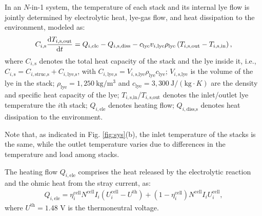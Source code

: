 \documentclass[review,3p,10pt]{elsarticle}
\begin{document}
In an $N$-in-1 system, the temperature of each stack and its internal lye flow is jointly determined by electrolytic heat, lye-gas flow, and heat dissipation to the environment, modeled as:
\begin{align}
  C_{i,\text{s}} \dfrac{{\text{d}}T_{i,\text{s,out}}}{\text{d}t} = Q_{i,\text{ele}} - Q_{i,\text{s,diss}} - c_{\text{lye}} v_{i,\text{lye}} \rho_{\rm{lye}} \left( T_{i,\text{s,out}} - T_{i,\text{s,in}} \right), \label{eq:heatstack}
\end{align}
where $C_{i,\text{s}}$ denotes the total heat capacity of the stack and the lye inside it, i.e., $C_{i,\text{s}} = C_{i,\text{struc,s}} + C_{i,\text{lye,s}}$, with $C_{i,\text{lye,s}} = V_{i,\text{s,lye}} \rho_\text{lye} c_\text{lye}$; $V_{i,\text{s,lye}}$ is the volume of the lye in the stack; $\rho_\text{lye} = 1,250\ \text{kg}/\text{m}^{3}$ and $c_\text{lye} = 3,300\ \text{J}/(\text{kg}\cdot{K})$  are the density and specific heat capacity of the lye; $T_{i,\text{s,in}}$/$T_{i,\text{s,out}}$ denotes the inlet/outlet lye temperature the $i$th stack; %
$Q_{i,\text{ele}}$ denotes heating flow; $Q_{i,\text{diss,s}}$ denotes heat dissipation to the environment. %

Note that, as indicated in Fig. \ref{fig:sys}(b), the inlet temperature of the stacks %
is the same, while the outlet temperature varies due to differences in the temperature and load among stacks.

The heating flow $Q_{i,\text{ele}}$ comprises the heat released by the electrolytic reaction and the ohmic heat from the stray current, as:
\begin{align}
  Q_{i,\text{ele}} = \eta_i^{\text{cell}} N^{\text{cell}} I_i \left( U_i^{\text{cell}} - U^{\text{th}} \right) + \left( 1 - \eta_i^{\text{cell}} \right) N^{\text{cell}} I_i U_i^{\text{cell}}, \label{eq:heatele}
\end{align}
where $U^\text{th}=1.48$ V is the thermoneutral voltage. %
\end{document}
